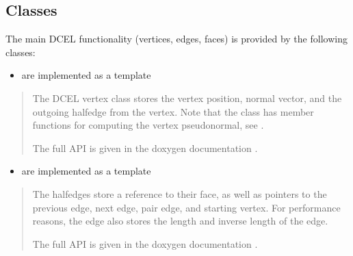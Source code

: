 \documentclass[letterpaper,10pt,english]{sphinxmanual}
\begin{document}
\subsection{Classes}
\label{\detokenize{ImplemDCEL:classes}}
\sphinxAtStartPar
The main DCEL functionality (vertices, edges, faces) is provided by the following classes:
\begin{itemize}
\item {} 
\sphinxAtStartPar
{} are implemented as a template 

\end{itemize}
\begin{quote}

\begin{sphinxVerbatim}[commandchars=\\\{\}]
  
 
\end{sphinxVerbatim}

\sphinxAtStartPar
The DCEL vertex class stores the vertex position, normal vector, and the outgoing half\sphinxhyphen{}edge from the vertex.
Note that the class has member functions for computing the vertex pseudonormal, see {\hyperref[\detokenize{DCEL:chap-normaldcel}]{}}.

\sphinxAtStartPar
The full API is given in the doxygen documentation .
\end{quote}
\begin{itemize}
\item {} 
\sphinxAtStartPar
{} are implemented as a template 

\end{itemize}
\begin{quote}

\begin{sphinxVerbatim}[commandchars=\\\{\}]
  
 
\end{sphinxVerbatim}

\sphinxAtStartPar
The half\sphinxhyphen{}edges store a reference to their face, as well as pointers to the previous edge, next edge, pair edge, and starting vertex.
For performance reasons, the edge also stores the length and inverse length of the edge.

\sphinxAtStartPar
The full API is given in the doxygen documentation .
\end{quote}
\end{document}
